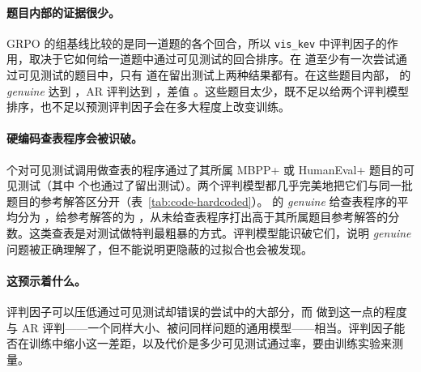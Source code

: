\paragraph{题目内部的证据很少。} GRPO 的组基线比较的是同一道题的各个回合，所以 \texttt{vis\_kev} 中评判因子的作用，取决于它如何给一道题中通过可见测试的回合排序。在  道至少有一次尝试通过可见测试的题目中，只有  道在留出测试上两种结果都有。在这些题目内部，\kev{} 的 \emph{genuine} 达到 ，AR 评判达到 ，差值  。这些题目太少，既不足以给两个评判模型排序，也不足以预测评判因子会在多大程度上改变训练。

\paragraph{硬编码查表程序会被识破。}  个对可见测试调用做查表的程序通过了其所属 MBPP+ 或 HumanEval+ 题目的可见测试（其中  个也通过了留出测试）。两个评判模型都几乎完美地把它们与同一批题目的参考解答区分开（表~\ref{tab:code-hardcoded}）。\kev{} 的 \emph{genuine} 给查表程序的平均分为 ，给参考解答的为 ，从未给查表程序打出高于其所属题目参考解答的分数。这类查表是对测试做特判最粗暴的方式。评判模型能识破它们，说明 \emph{genuine} 问题被正确理解了，但不能说明更隐蔽的过拟合也会被发现。

\begin{table}[t]
\centering\small

\caption{在  道可见测试允许构造查表程序的 MBPP+ 和 HumanEval+ 题目上，参考解答对硬编码查表程序：AUROC、两类程序的平均 $p(\text{yes})$，以及查表程序得分高于其所属题目参考解答的频率。}
\label{tab:code-hardcoded}
\end{table}

\paragraph{这预示着什么。} 评判因子可以压低通过可见测试却错误的尝试中的大部分，而 \kev{} 做到这一点的程度与 AR 评判——一个同样大小、被问同样问题的通用模型——相当。评判因子能否在训练中缩小这一差距，以及代价是多少可见测试通过率，要由训练实验来测量。
